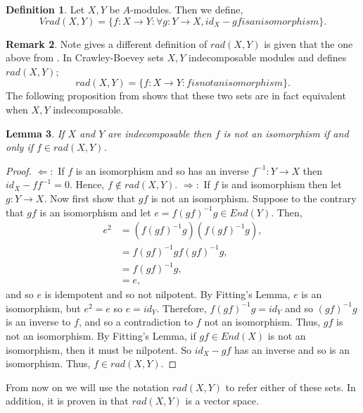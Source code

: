 \documentclass[11.5pt, twoside, a4paper, titlepage]{report}
\theoremstyle{definition}
\newtheorem{mydef}{Definition}[section]
\newtheorem{rem}[mydef]{Remark}
\theoremstyle{plain}
\newtheorem{lem}[mydef]{Lemma}
\begin{document}
\begin{mydef}
Let $X,Y$ be $A$-modules. Then we define,
\begin{equation*}
Vrad(X,Y)=\{f: X \to Y: \forall g:Y \to X, id_X-gf is an isomorphism\}.
\end{equation*}
\end{mydef}

\begin{rem}
Note \cite{CB3} gives a different definition of $rad(X,Y)$ is given that the one above from \cite{Vale}. In \cite{CB3} Crawley-Boevey sets $X,Y$ indecomposable modules and defines $rad(X,Y)$;
\begin{equation*}
rad(X,Y)=\{f: X \to Y: f is not an isomorphism\}.
\end{equation*}
The following proposition from \cite{Vale} shows that these two sets are in fact equivalent when $X,Y$ indecomposable.
\end{rem}

\begin{lem} \label{isoradlem}
If $X$ and $Y$ are indecomposable then $f$ is not an isomorphism if and only if $f \in rad(X,Y)$.
\end{lem}
\begin{proof}
$\Leftarrow:$ If $f$ is an isomorphism and so has an inverse $f^{-1}: Y \to X$ then $id_X - ff^{-1}=0$. Hence, $f\notin rad(X,Y)$.
$\Rightarrow:$ If $f $ is and isomorphism then let $g: Y \to X$. Now first show that $gf$ is not an isomorphism. Suppose to the contrary that $gf$ is an isomorphism and let $e=f(gf)^{-1}g \in End(Y)$. Then,
\begin{align*}
e^2&=(f(gf)^{-1}g)(f(gf)^{-1}g),\\
&=f(gf)^{-1}gf(gf)^{-1}g,\\
&=f(gf)^{-1}g,\\
&=e,
\end{align*}
and so $e$ is idempotent and so not nilpotent. By Fitting's Lemma, $e$ is an isomorphism, but $e^2=e$ so $e=id_Y$. Therefore, $f(gf)^{-1}g=id_Y$ and so $(gf)^{-1}g$ is an inverse to $f$, and so a contradiction to $f$ not an isomorphism. Thus, $gf$ is not an isomorphism. By Fitting's Lemma, if $gf\in End(X)$ is not an isomorphism, then it must be nilpotent. So $id_X -gf$ has an inverse and so is an isomorphism. Thus, $f\in rad(X,Y)$.
\end{proof}

From now on we will use the notation $rad(X,Y)$ to refer either of these sets. In addition, it is proven in \cite{Vale} that $rad(X,Y)$ is a vector space.\\
\end{document}
